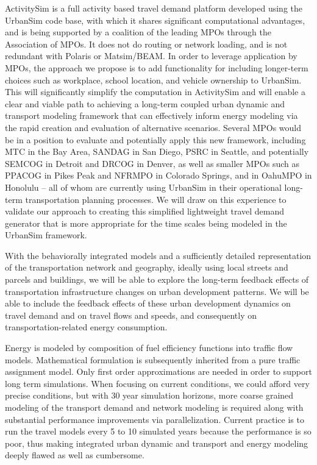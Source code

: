 ActivitySim is a full activity based travel demand platform developed using the UrbanSim code base, with which it shares significant computational advantages, and is being supported by a coalition of the leading MPOs through the Association of MPOs. It does not do routing or network loading, and is not redundant with Polaris or Matsim/BEAM. In order to leverage application by MPOs, the approach we propose is to add functionality for including longer-term choices such as workplace, school location, and vehicle ownership to UrbanSim. This will significantly simplify the computation in ActivitySim and will enable a clear and viable path to achieving a long-term coupled urban dynamic and transport modeling framework that can effectively inform energy modeling via the rapid creation and evaluation of alternative scenarios. Several MPOs would be in a position to evaluate and potentially apply this new framework, including MTC in the Bay Area, SANDAG in San Diego, PSRC in Seattle, and potentially SEMCOG in Detroit and DRCOG in Denver, as well as smaller MPOs such as PPACOG in Pikes Peak and NFRMPO in Colorado Springs, and in OahuMPO in Honolulu -- all of whom are currently using UrbanSim in their operational long-term transportation planning processes. We will draw on this experience to validate our approach to creating this simplified lightweight travel demand generator that is more appropriate for the time scales being modeled in the UrbanSim framework. 
 
With the behaviorally integrated models and a sufficiently detailed representation of the transportation network and geography, ideally using local streets and parcels and buildings, we will be able to explore the long-term feedback effects of transportation infrastructure changes on urban development patterns. We will be able to include the feedback effects of these urban development dynamics on travel demand and on travel flows and speeds, and consequently on transportation-related energy consumption.

Energy is modeled by composition of fuel efficiency functions into traffic flow models. Mathematical formulation is subsequently inherited from a pure traffic assignment model. Only first order approximations are needed in order to support long term simulations. When focusing on current conditions, we could afford very precise conditions, but with 30 year simulation horizons, more coarse grained modeling of the transport demand and network modeling is required along with substantial performance improvements via parallelization. Current practice is to run the travel models every 5 to 10 simulated years because the performance is so poor, thus making integrated urban dynamic and transport and energy modeling deeply flawed as well as cumbersome.


